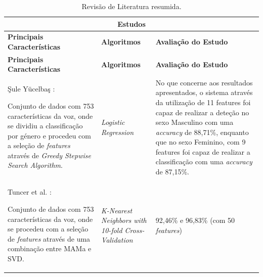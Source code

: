 \documentclass[12pt,a4paper,twoside]{report}
\begin{document}
{\begin{longtable}{|p{6cm}|p{4cm}|p{6cm}|}
\caption{Revisão de Literatura resumida.} \\ \hline
\multicolumn{3}{|c|}{\textbf{Estudos}} \\ \hline
\textbf{Principais Características} & \textbf{Algoritmos} & \textbf{Avaliação do Estudo} \\ \hline
\endfirsthead

\hline
\textbf{Principais Características} & \textbf{Algoritmos} & \textbf{Avaliação do Estudo} \\ \hline
\endhead

Şule Yücelbaş \cite{yucelbaslogistic}:

Conjunto de dados com 753 características da voz, onde se dividiu a classificação por género e procedeu com a seleção de \textit{features} através de \textit{Greedy Stepwise Search Algorithm}.

& \textit{Logistic Regression}

& No que concerne aos resultados apresentados, o sistema através da utilização de 11 features foi capaz de realizar a deteção no sexo Masculino com uma \textit{accuracy} de 88,71\%, enquanto que no sexo Feminino, com 9 features foi capaz de realizar a classificação com uma \textit{accuracy} de 87,15\%. \\ \hline

Tuncer et al. \cite{Tuncer2020}:

Conjunto de dados com 753 características da voz, onde se procedeu com a seleção de \textit{features} através de uma combinação entre \gls{MAMa} e \gls{SVD}.

& \textit{K-Nearest Neighbors with 10-fold Cross-Validation}

& 92,46\% e 96,83\% (com 50 \textit{features}) \\ \hline



\end{longtable}}
\end{document}
